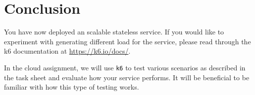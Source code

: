 \documentclass{csse4400}
\begin{document}
\section{Conclusion}
You have now deployed an scalable stateless service.
If you would like to experiment with generating different load for the service,
please read through the k6 documentation at \url{https://k6.io/docs/}.

In the cloud assignment,
we will use \texttt{k6} to test various scenarios as described in the task sheet and evaluate how your service performs.
It will be beneficial to be familiar with how this type of testing works.



\end{document}
